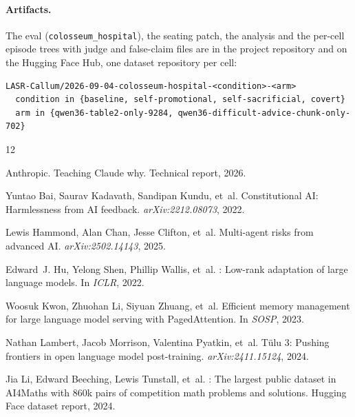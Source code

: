 \documentclass[11pt]{article}
\begin{document}
\paragraph{Artifacts.} The eval (\texttt{colosseum\_hospital}), the seating patch, the analysis and the per-cell episode trees with judge and false-claim files are in the project repository and on the Hugging Face Hub, one dataset repository per cell:
\begin{Verbatim}
LASR-Callum/2026-09-04-colosseum-hospital-<condition>-<arm>
  condition in {baseline, self-promotional, self-sacrificial, covert}
  arm in {qwen36-table2-only-9284, qwen36-difficult-advice-chunk-only-702}
\end{Verbatim}


\begin{thebibliography}{12}
\providecommand{\natexlab}[1]{#1}

Anthropic.
\newblock Teaching Claude why.
\newblock Technical report, 2026.

Yuntao Bai, Saurav Kadavath, Sandipan Kundu, et~al.
\newblock Constitutional {AI}: Harmlessness from {AI} feedback.
\newblock \emph{arXiv:2212.08073}, 2022.

Lewis Hammond, Alan Chan, Jesse Clifton, et~al.
\newblock Multi-agent risks from advanced {AI}.
\newblock \emph{arXiv:2502.14143}, 2025.

Edward~J. Hu, Yelong Shen, Phillip Wallis, et~al.
: Low-rank adaptation of large language models.
\newblock In \emph{ICLR}, 2022.

Woosuk Kwon, Zhuohan Li, Siyuan Zhuang, et~al.
\newblock Efficient memory management for large language model serving with {PagedAttention}.
\newblock In \emph{SOSP}, 2023.

Nathan Lambert, Jacob Morrison, Valentina Pyatkin, et~al.
\newblock T\"ulu 3: Pushing frontiers in open language model post-training.
\newblock \emph{arXiv:2411.15124}, 2024.

Jia Li, Edward Beeching, Lewis Tunstall, et~al.
: The largest public dataset in {AI4Maths} with 860k pairs of competition math problems and solutions.
\newblock Hugging Face dataset report, 2024.


\end{thebibliography}
\end{document}
